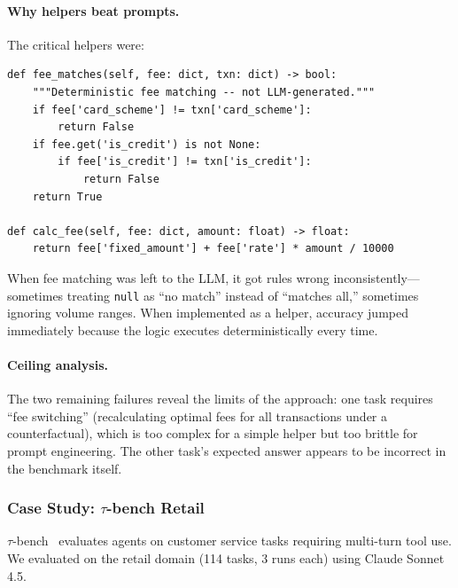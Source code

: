 \documentclass[11pt, logo, onecolumn, copyright, colorlinks=true, allcolors=blue]{nvidiatechreport}
\begin{document}
\paragraph{Why helpers beat prompts.} The critical helpers were:

\begin{lstlisting}
def fee_matches(self, fee: dict, txn: dict) -> bool:
    """Deterministic fee matching -- not LLM-generated."""
    if fee['card_scheme'] != txn['card_scheme']:
        return False
    if fee.get('is_credit') is not None:
        if fee['is_credit'] != txn['is_credit']:
            return False
    return True

def calc_fee(self, fee: dict, amount: float) -> float:
    return fee['fixed_amount'] + fee['rate'] * amount / 10000
\end{lstlisting}

When fee matching was left to the LLM, it got rules wrong inconsistently---
sometimes treating \texttt{null} as ``no match'' instead of ``matches all,''
sometimes ignoring volume ranges. When implemented as a helper, accuracy jumped
immediately because the logic executes deterministically every time.

\paragraph{Ceiling analysis.} The two remaining failures reveal the limits of
the approach: one task requires ``fee switching'' (recalculating optimal fees
for all transactions under a counterfactual), which is too complex for a simple
helper but too brittle for prompt engineering. The other task's expected answer
appears to be incorrect in the benchmark itself.

\subsubsection{Case Study: $\tau$-bench Retail}
\label{sec:optimization:taubench}

$\tau$-bench~\cite{taubench2024} evaluates agents on customer service tasks
requiring multi-turn tool use. We evaluated on the retail domain (114 tasks,
3 runs each) using Claude Sonnet 4.5.
\end{document}

